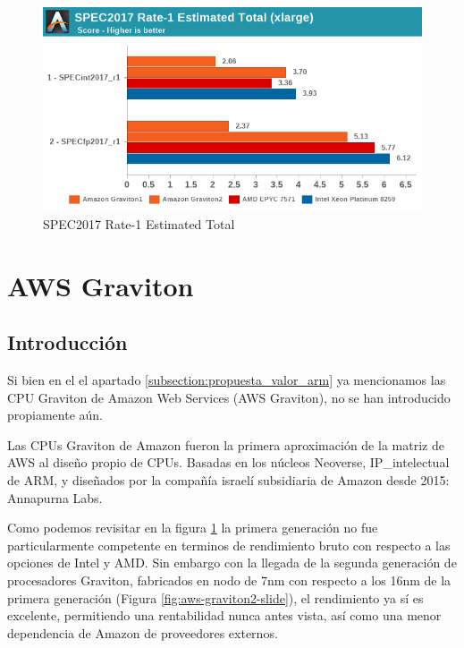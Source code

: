 \documentclass[a4paper,openright,12pt]{article}
\begin{document}
\begin{figure}[h]
\includegraphics[width=\textwidth]{img/graviton_vs_amd_vs_intel_spec_total.png}
\caption{SPEC2017 Rate-1 Estimated Total}
\label{fig:graviton_vs_amd_vs_intel_spec_total}
\end{figure}


\newpage
\section{AWS Graviton}
\subsection{Introducción}\label{subsection:aws_graviton_introduccion}
Si bien en el el apartado \ref{subsection:propuesta_valor_arm} ya mencionamos las CPU Graviton de Amazon Web Services (AWS Graviton), no se han introducido propiamente aún.

\bigskip

Las CPUs Graviton de Amazon fueron la primera aproximación de la matriz de AWS al diseño propio de CPUs. Basadas en los núcleos \gls{Neoverse}, \gls{IP_intelectual} de ARM, y
diseñados por la compañía israelí subsidiaria de Amazon desde 2015: Annapurna Labs.

Como podemos revisitar en la figura \ref{fig:graviton_vs_amd_vs_intel_spec_total} la primera generación no fue particularmente competente en terminos de rendimiento bruto con respecto a
las opciones de Intel y AMD. Sin embargo con la llegada de la segunda generación de procesadores Graviton, fabricados en nodo de 7nm con respecto a los 16nm de la primera generación
(Figura \ref{fig:aws-graviton2-slide}), el rendimiento ya sí es excelente, permitiendo una rentabilidad nunca antes vista, así como una menor dependencia de Amazon de proveedores
externos. \autocite[]{graviton1_graviton2_zdnet_aws}
\end{document}

